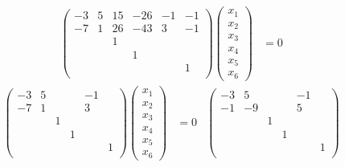 \documentclass[12pt,a4paper]{article}
\begin{document}
\begin{problem*}
\begin{enumerate}
\begin{align*}
                    \begin{pmatrix}
                        -3& 5& 15& -26& -1& -1\\
                        -7& 1& 26& -43& 3& -1\\
                        & & 1& & & \\
                        & & & 1& & \\
                        & & & & & 1\\
                    \end{pmatrix}
                    \begin{pmatrix}
                        x_1\\x_2\\x_3\\x_4\\x_5\\x_6
                    \end{pmatrix}
                    &= 0
                \end{align*}
                \begin{align*}
                    \begin{pmatrix}
                        -3& 5& & & -1& \\
                        -7& 1& & & 3& \\
                        & & 1& & & \\
                        & & & 1& & \\
                        & & & & & 1\\
                    \end{pmatrix}
                    \begin{pmatrix}
                        x_1\\x_2\\x_3\\x_4\\x_5\\x_6
                    \end{pmatrix}
                    &= 0&
                    \begin{pmatrix}
                        -3& 5& & & -1& \\
                        -1& -9& & & 5& \\
                        & & 1& & & \\
                        & & & 1& & \\
                        & & & & & 1\\
                    \end{pmatrix}

\end{align*}
\end{enumerate}
\end{problem*}
\end{document}
